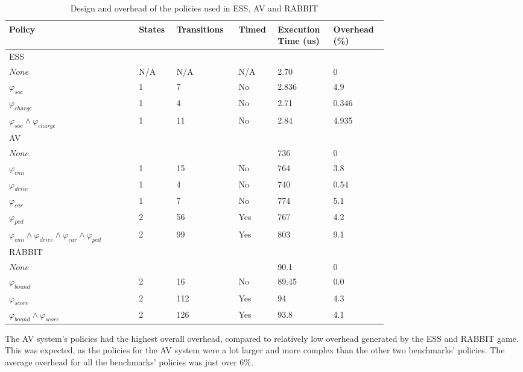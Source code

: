 \begin{table}[h]
	\centering
	\caption{Design and overhead of the policies used in \ac{ESS}, \ac{AV} and RABBIT}
	\label{table:policies}
	\begin{tabular}{|p{0.3\linewidth}|p{0.06\linewidth}|p{0.12\linewidth}|p{0.06\linewidth}|p{0.09\linewidth}|p{0.1\linewidth}|}
		\hline Policy & States & Transitions & Timed & Execution Time (us) & Overhead (\%) \\ \hline
		\multicolumn{6}{|p{0.70\linewidth}|}{\ac{ESS}} \\ \hline 
		$None$ 										& N/A & N/A & N/A & 2.70 & 0 \\ 	
		$\varphi_{soc}$    							& 1 & 7 & No & 2.836 & 4.9 \\
		$\varphi_{charge}$    						& 1 & 4 & No & 2.71 & 0.346 \\
		$\varphi_{soc} \wedge \varphi_{charge}$  	& 1 & 11 & No & 2.84 & 4.935 \\ \hline       
		\multicolumn{6}{|p{0.70\linewidth}|}{\ac{AV}} \\ \hline
		$None$ 						&  &  &  & 736 & 0 \\
		$\varphi_{cnn}$ 			& 1 & 15 & No & 764 & 3.8 \\
		$\varphi_{drive}$ 			& 1 & 4 & No & 740 & 0.54 \\
		$\varphi_{car}$ 			& 1 & 7 & No & 774 & 5.1 \\
		$\varphi_{ped}$ 			& 2 & 56 & Yes & 767 & 4.2 \\
		$\varphi_{cnn} \wedge \varphi_{drive} \wedge \varphi_{car} \wedge \varphi_{ped}$ 	
		& 2 & 99 & Yes & 803 & 9.1 \\ \hline       
		\multicolumn{6}{|p{0.70\linewidth}|}{RABBIT} \\ \hline
		$None$ 										&  &  &  & 90.1 & 0 \\ 
		$\varphi_{bound}$ 							& 2 & 16 & No & 89.45 & 0.0 \\
		$\varphi_{score}$ 							& 2 & 112 & Yes & 94 & 4.3 \\
		$\varphi_{bound} \wedge \varphi_{score}$ 	& 2 & 126 & Yes & 93.8 & 4.1 \\ \hline      
	\end{tabular}
\end{table}

The \ac{AV} system's policies had the highest overall overhead, compared to relatively low overhead generated by the \ac{ESS} and RABBIT game.
This was expected, as the policies for the \ac{AV} system were a lot larger and more complex than the other two benchmarks' policies.
The average overhead for all the benchmarks' policies was just over 6\%.

